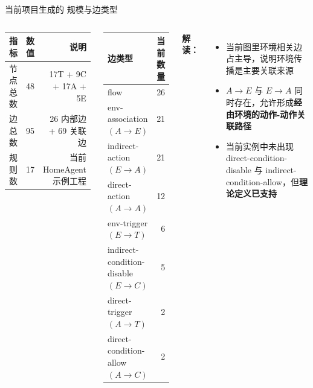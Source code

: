 \documentclass[aspectratio=169,10pt]{beamer}
\newcommand{\HL}[1]{\textcolor{emphasis}{#1}}
\newcommand{\RAG}{\text{RAG}}
\begin{document}
\begin{frame}{当前项目生成的 \RAG 规模与边类型}
\begin{columns}[T]
  \begin{center}
  \small
  \begin{tabular}{lrr}
  \toprule
  指标 & 数值 & 说明 \\
  \midrule
  节点总数 & 48 & 17T + 9C + 17A + 5E \\
  边总数 & 95 & 26 内部边 + 69 关联边 \\
  规则数 & 17 & 当前 HomeAgent 示例工程 \\
  \bottomrule
  \end{tabular}
  \end{center}

  \vspace{4pt}
  \begin{center}
  \small
  \begin{tabular}{lr}
  \toprule
  边类型 & 当前数量 \\
  \midrule
  flow & 26 \\
  env-association $(A\rightarrow E)$ & 21 \\
  indirect-action $(E\rightarrow A)$ & 21 \\
  direct-action $(A\rightarrow A)$ & 12 \\
  env-trigger $(E\rightarrow T)$ & 6 \\
  indirect-condition-disable $(E\rightarrow C)$ & 5 \\
  direct-trigger $(A\rightarrow T)$ & 2 \\
  direct-condition-allow $(A\rightarrow C)$ & 2 \\
  \bottomrule
  \end{tabular}
  \end{center}

  \textbf{解读：}
  \begin{itemize}
    \item 当前图里\HL{环境相关边占主导}，说明环境传播是主要关联来源
    \item $A\rightarrow E$ 与 $E\rightarrow A$ 同时存在，允许形成\textbf{经由环境的动作-动作关联路径}
    \item 当前实例中未出现 direct-condition-disable 与 indirect-condition-allow，但\textbf{理论定义已支持}
  \end{itemize}
\end{columns}
\end{frame}
\end{document}
